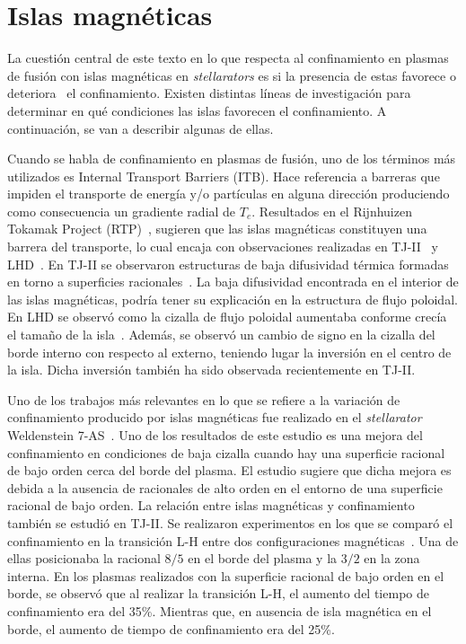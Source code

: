 \section{Islas magnéticas}
La cuestión central de este texto en lo que respecta al confinamiento en plasmas de fusión con
islas magnéticas en \textit{stellarators} es si la presencia de estas favorece o deteriora~\cite{Transport_1999} el confinamiento.
Existen distintas líneas de investigación para determinar en qué condiciones las islas
favorecen el confinamiento. A continuación, se van a describir algunas de ellas.\par
Cuando se habla de confinamiento en plasmas de fusión, uno de los términos más utilizados
es Internal Transport Barriers (ITB). Hace referencia a barreras
que impiden el transporte de energía y/o partículas en alguna dirección produciendo como
consecuencia un gradiente radial de $T_e$.
Resultados en el Rijnhuizen Tokamak Project (RTP)~\cite{PhysRevLett.82.5048}, sugieren que las islas 
magnéticas constituyen una barrera
del transporte, lo cual encaja con observaciones realizadas en TJ-II~\cite{Castej_n_2004,Estrada_2003} y 
LHD~\cite{PhysRevLett.84.103}. 
En TJ-II se observaron estructuras de baja difusividad térmica formadas en torno a superficies
racionales~\cite{Vargas_2007,Estrada_2007}.
La baja difusividad encontrada en el interior de las islas magnéticas, podría tener su explicación 
en la estructura de flujo poloidal. En LHD se observó como la cizalla de flujo poloidal
aumentaba conforme crecía el tamaño de la isla~\cite{PhysRevLett.88.015002}. 
Además, se observó un cambio de signo en
la cizalla del borde interno con respecto al externo, teniendo lugar la inversión en el centro de
la isla. Dicha inversión también ha sido observada recientemente en TJ-II.\par
Uno de los trabajos más relevantes en lo que se refiere a la variación de confinamiento
producido por islas magnéticas fue realizado en el \textit{stellarator} Weldenstein 7-AS~\cite{Brakel_2002}. 
Uno de los resultados de este estudio es una mejora del confinamiento en
condiciones de baja cizalla cuando hay una superficie racional de bajo orden cerca del borde
del plasma. El estudio sugiere que dicha mejora es debida a la ausencia de racionales de alto
orden en el entorno de una superficie racional de bajo orden.
La relación entre islas magnéticas y confinamiento también se estudió en TJ-II. Se realizaron
experimentos en los que se comparó el confinamiento en la transición L-H entre dos
configuraciones magnéticas~\cite{Estrada_2009}. 
Una de ellas posicionaba la racional $8/5$ en el borde del plasma
y la $3/2$ en la zona interna. En los plasmas realizados con la superficie racional de bajo
orden en el borde, se observó que al realizar la transición L-H, el aumento del tiempo de
confinamiento era del 35\%. Mientras que, en ausencia de isla magnética en el borde, 
el aumento de tiempo de confinamiento era del 25\%.
